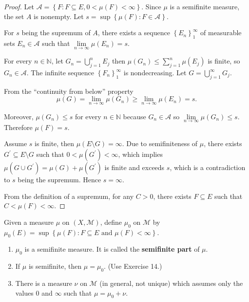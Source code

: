 \begin{proof}
    Let \( \mathcal{A} = \left\{ F : F \subseteq E, 0 < \mu(F) < \infty \right\} \). Since \( \mu \) is a semifinite measure, the set \( A \) is nonempty. Let \( s = \sup \left\{ \mu(F) : F \in \mathcal{A} \right\} \).

    For \( s \) being the supremum of \( A \), there exists a sequence \( {\left\{ E_{n} \right\}}_{1}^{\infty} \) of measurable sets \( E_{n} \in \mathcal{A} \) such that \( \lim\limits_{n\to\infty} \mu(E_{n}) = s \).

    For every \( n \in \mathbb{N} \), let \( G_{n} = \bigcup_{j=1}^{n} E_{j} \) then \( \mu(G_{n}) \le \sum_{j=1}^{n} \mu(E_{j}) \) is finite, so \( G_{n} \in \mathcal{A} \). The infinite sequence \( {\left\{ F_{n} \right\}}_{1}^{\infty} \) is nondecreasing. Let \( G = \bigcup_{j=1}^{\infty} G_{j} \).

    From the ``continuity from below'' property
    \[
        \mu(G) = \lim\limits_{n \to \infty} \mu(G_{n}) \ge \lim\limits_{n\to\infty} \mu(E_{n}) = s.
    \]

    Moreover, \( \mu(G_{n}) \le s \) for every \( n \in \mathbb{N} \) because \( G_{n} \in \mathcal{A} \) so \( \lim\limits_{n \to \infty} \mu(G_{n}) \le s \). Therefore \( \mu(F) = s \).

    Assume \( s \) is finite, then \( \mu(E \setminus G) = \infty \). Due to semifiniteness of \( \mu \), there exists \( G^{\prime} \subseteq E \setminus G \) such that \( 0 < \mu(G^{\prime}) < \infty \), which implies \( \mu(G \cup G^{\prime}) = \mu(G) + \mu(G^{\prime}) \) is finite and exceeds \( s \), which is a contradiction to \( s \) being the supremum. Hence \( s = \infty \).

    From the definition of a supremum, for any \( C > 0 \), there exists \( F \subseteq E \) such that \( C < \mu(F) < \infty \).
\end{proof}

\newpage

\begin{exercise}
    Given a measure \( \mu \) on \( (X, \mathcal{M}) \), define \( \mu_{0} \) on \( \mathcal{M} \) by \( \mu_{0}(E) = \sup\left\{ \mu(F): F \subseteq E \text{ and } \mu(F) < \infty \right\} \).
    \begin{enumerate}[itemsep=0pt,label=\textbf{\alph*.}]
        \item \( \mu_{0} \) is a semifinite measure. It is called the \textbf{semifinite part} of \( \mu \).
        \item If \( \mu \) is semifinite, then \( \mu = \mu_{0} \). (Use Exercise 14.)
        \item There is a measure \( \nu \) on \( \mathcal{M} \) (in general, not unique) which assumes only the values \( 0 \) and \( \infty \) such that \( \mu = \mu_{0} + \nu \).
    \end{enumerate}
\end{exercise}

